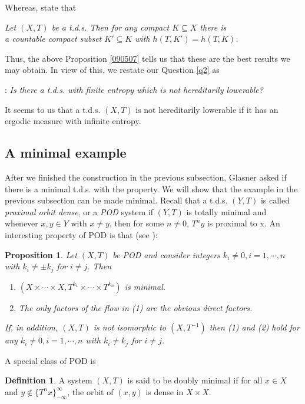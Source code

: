 \documentclass[12pt]{amsart}
\newtheorem{prop}[thm]{Proposition}
\theoremstyle{definition} \theoremstyle{question}
\newtheorem{defn}[thm]{Definition}
\numberwithin{equation}{section}
\begin{document}
\noindent Whereas, \cite[Theorem 5.9 and Remark 5.13]{YZ} state that

\begin{center}
{\it Let $(X, T)$ be a t.d.s. Then for any compact $K\subseteq X$
there is\\
 a countable compact subset $K'\subseteq K$ with $h (T,
K')= h (T, K)$.}
\end{center}

\noindent Thus, the above Proposition \ref{090507} tells us that
these are the best results we may obtain. In view of this, we
restate our Question \ref{q2} as

\medskip

: {\it Is there a t.d.s. with finite
entropy which is not hereditarily lowerable?}

\medskip

It seems to us that a t.d.s. $(X,T)$ is not hereditarily lowerable
if it has an ergodic measure with infinite entropy.

\subsection{A minimal example} After we finished the construction in
the previous subsection, Glasner asked if there is a minimal t.d.s.
with the property. We will show that the example in the previous
subsection can be made minimal. Recall that a t.d.s. $(Y, T)$ is
called {\it proximal orbit dense}, or a {\it POD} system if $(Y,T)$
is totally minimal and whenever $x,y\in Y$ with $x\not=y$, then for
some $n\not=0$, $T^ny$ is proximal to x. An interesting property of
POD is that (see \cite[Corollary 3.5]{KN}):

\begin{prop}\label{KN}  Let $(X, T)$ be POD and consider integers $k_i\not=0, i = 1, \cdots, n$
with $k_i\not=\pm k_j$ for $i\not=j$. Then \begin{enumerate}
\item $(X\times \cdots \times X, T^{k_1}\times \cdots\times T^{k_n})$ is minimal.
\item The only factors of the flow in (1) are the obvious direct
factors. \end{enumerate} If, in addition, $(X, T)$ is not isomorphic
to $(X, T^{-1})$ then (1) and (2) hold for any $k_i\not=0, i = 1,
\cdots, n$ with $k_i\not=k_j$ for $i\not=j$.
\end{prop}

A special class of POD is
\begin{defn} A system $(X, T)$ is said to be doubly minimal if for all $x\in
X$ and $y\not\in \{T^nx\}_{-\infty}^\infty$, the orbit of $(x,y)$ is
dense in $X\times X$.
\end{defn}
\end{document}
